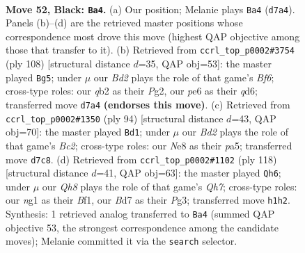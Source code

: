 \documentclass[11pt]{article}
\begin{document}
\clearpage

\begin{figure}[p]\centering
\begin{subfigure}{0.46\textwidth}\centering
\resizebox{\linewidth}{!}{%
\newchessgame
\chessboard[
  setfen={4n1k1/3b4/p3P3/3P1p1p/6p1/N7/1Q3P2/5KNq b - - 0 52},
  showmover=false,
  pgfstyle=straightmove, color=movearrow, markmove={d7-a4}
]}
\caption{}
\end{subfigure}\hfill
\begin{subfigure}{0.46\textwidth}\centering
\resizebox{\linewidth}{!}{%
\newchessgame
\chessboard[
  setfen={1Q6/2n2k2/2pq1Bp1/4p3/4P2P/1P6/6PK/8 w - - 23 55},
  showmover=false,
  pgfstyle=straightmove, color=movearrow, markmove={f6-g5}
]}
\caption{}
\end{subfigure}
\\[4pt]
\begin{subfigure}{0.46\textwidth}\centering
\resizebox{\linewidth}{!}{%
\newchessgame
\chessboard[
  setfen={5Q2/6np/6pk/p3q3/7P/1p4P1/2B2PK1/8 w - - 0 48},
  showmover=false,
  pgfstyle=straightmove, color=movearrow, markmove={c2-d1}
]}
\caption{}
\end{subfigure}\hfill
\begin{subfigure}{0.46\textwidth}\centering
\resizebox{\linewidth}{!}{%
\newchessgame
\chessboard[
  setfen={8/5knQ/6p1/2p4p/2P1p2P/6P1/5P2/3q1BK1 w - - 4 60},
  showmover=false,
  pgfstyle=straightmove, color=movearrow, markmove={h7-h6}
]}
\caption{}
\end{subfigure}
\caption{\textbf{Move 52, Black: \texttt{Ba4}.} (a) Our position; Melanie plays \texttt{Ba4} (\texttt{d7a4}). Panels (b)--(d) are the retrieved master positions whose correspondence most drove this move (highest QAP objective among those that transfer to it). (b) Retrieved from \texttt{ccrl\_top\_p0002\#3754} (ply 108) [structural distance $d$=35, QAP obj=53]: the master played \texttt{Bg5}; under $\mu$ our \emph{Bd2} plays the role of that game's \emph{Bf6}; cross-type roles: our \emph{q}b2 as their \emph{P}g2, our \emph{p}e6 as their \emph{q}d6; transferred move \texttt{d7a4} \textbf{(endorses this move)}. (c) Retrieved from \texttt{ccrl\_top\_p0002\#1350} (ply 94) [structural distance $d$=43, QAP obj=70]: the master played \texttt{Bd1}; under $\mu$ our \emph{Bd2} plays the role of that game's \emph{Bc2}; cross-type roles: our \emph{N}e8 as their \emph{p}a5; transferred move \texttt{d7c8}. (d) Retrieved from \texttt{ccrl\_top\_p0002\#1102} (ply 118) [structural distance $d$=41, QAP obj=63]: the master played \texttt{Qh6}; under $\mu$ our \emph{Qh8} plays the role of that game's \emph{Qh7}; cross-type roles: our \emph{n}g1 as their \emph{B}f1, our \emph{B}d7 as their \emph{P}g3; transferred move \texttt{h1h2}. Synthesis: 1 retrieved analog transferred to \texttt{Ba4} (summed QAP objective 53, the strongest correspondence among the candidate moves); Melanie committed it via the \texttt{search} selector.}
\label{fig:thought-m103}
\end{figure}
\end{document}
